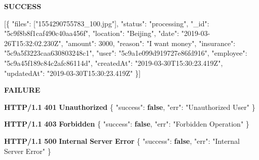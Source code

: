 \documentclass[
]{article}
\newenvironment{Shaded}{}{}
\newcommand{\DataTypeTok}[1]{\textcolor[rgb]{0.56,0.13,0.00}{#1}}
\newcommand{\DecValTok}[1]{\textcolor[rgb]{0.25,0.63,0.44}{#1}}
\newcommand{\ErrorTok}[1]{\textcolor[rgb]{1.00,0.00,0.00}{\textbf{#1}}}
\newcommand{\FunctionTok}[1]{\textcolor[rgb]{0.02,0.16,0.49}{#1}}
\newcommand{\KeywordTok}[1]{\textcolor[rgb]{0.00,0.44,0.13}{\textbf{#1}}}
\newcommand{\OtherTok}[1]{\textcolor[rgb]{0.00,0.44,0.13}{#1}}
\newcommand{\StringTok}[1]{\textcolor[rgb]{0.25,0.44,0.63}{#1}}
\begin{document}
\textbf{SUCCESS}

\begin{Shaded}
\begin{Highlighting}[]
\OtherTok{[}\FunctionTok{\{}
    \DataTypeTok{"files"}\FunctionTok{:} \OtherTok{[}\StringTok{"1554290755783_100.jpg"}\OtherTok{]}\FunctionTok{,}
    \DataTypeTok{"status"}\FunctionTok{:} \StringTok{"processing"}\FunctionTok{,}
    \DataTypeTok{"_id"}\FunctionTok{:} \StringTok{"5c9f8b8f1caf490c40aa456f"}\FunctionTok{,}
    \DataTypeTok{"location"}\FunctionTok{:} \StringTok{"Beijing"}\FunctionTok{,}
    \DataTypeTok{"date"}\FunctionTok{:} \StringTok{"2019-03-26T15:32:02.230Z"}\FunctionTok{,}
    \DataTypeTok{"amount"}\FunctionTok{:} \DecValTok{3000}\FunctionTok{,}
    \DataTypeTok{"reason"}\FunctionTok{:} \StringTok{"I want money"}\FunctionTok{,}
    \DataTypeTok{"insurance"}\FunctionTok{:} \StringTok{"5c9a5f3223caa630803248c1"}\FunctionTok{,}
    \DataTypeTok{"user"}\FunctionTok{:} \StringTok{"5c9a1e099d919727e86fd916"}\FunctionTok{,}
    \DataTypeTok{"employee"}\FunctionTok{:} \StringTok{"5c9a45f189c84c2afc86114d"}\FunctionTok{,}
    \DataTypeTok{"createdAt"}\FunctionTok{:} \StringTok{"2019-03-30T15:30:23.419Z"}\FunctionTok{,}
    \DataTypeTok{"updatedAt"}\FunctionTok{:} \StringTok{"2019-03-30T15:30:23.419Z"}
\FunctionTok{\}}\OtherTok{]}
\end{Highlighting}
\end{Shaded}

\textbf{FAILURE}

\begin{Shaded}
\begin{Highlighting}[]
\ErrorTok{HTTP/1.1} \ErrorTok{401} \ErrorTok{Unauthorized}
\FunctionTok{\{}
    \DataTypeTok{"success"}\FunctionTok{:} \KeywordTok{false}\FunctionTok{,}
    \DataTypeTok{"err"}\FunctionTok{:} \StringTok{"Unauthorized User"}
\FunctionTok{\}}
\end{Highlighting}
\end{Shaded}

\begin{Shaded}
\begin{Highlighting}[]
\ErrorTok{HTTP/1.1} \ErrorTok{403} \ErrorTok{Forbidden}
\FunctionTok{\{}
    \DataTypeTok{"success"}\FunctionTok{:} \KeywordTok{false}\FunctionTok{,}
    \DataTypeTok{"err"}\FunctionTok{:} \StringTok{"Forbidden Operation"}
\FunctionTok{\}}
\end{Highlighting}
\end{Shaded}

\begin{Shaded}
\begin{Highlighting}[]
\ErrorTok{HTTP/1.1} \ErrorTok{500} \ErrorTok{Internal} \ErrorTok{Server} \ErrorTok{Error}
\FunctionTok{\{}
    \DataTypeTok{"success"}\FunctionTok{:} \KeywordTok{false}\FunctionTok{,}
    \DataTypeTok{"err"}\FunctionTok{:} \StringTok{"Internal Server Error"}
\FunctionTok{\}}
\end{Highlighting}
\end{Shaded}
\end{document}
